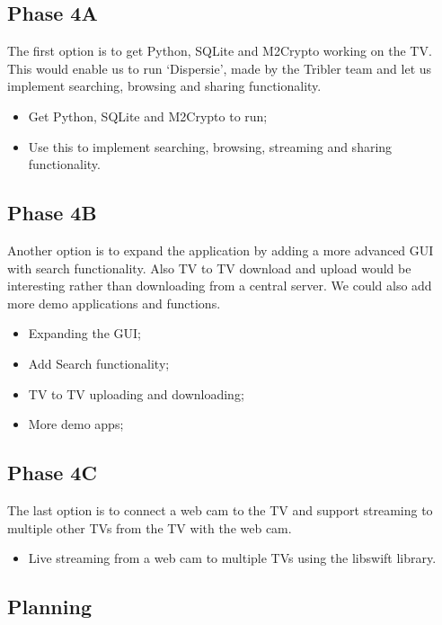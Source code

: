 \subsection{Phase 4A}
The first option is to get Python, SQLite and M2Crypto working on the TV. 
This would enable us to run `Dispersie', made by the Tribler team and let us implement searching, 
browsing and sharing functionality.

\begin{itemize}
\item Get Python, SQLite and M2Crypto to run;
\item Use this to implement searching, browsing, streaming and sharing functionality.
\end{itemize}

\subsection{Phase 4B}
Another option is to expand the application by adding a more advanced GUI with search functionality. 
Also TV to TV download and upload would be interesting rather than downloading from a central server. 
We could also add more demo applications and functions.

\begin{itemize}
\item Expanding the GUI;
\item Add Search functionality;
\item TV to TV uploading and downloading;
\item More demo apps;
\end{itemize}

\subsection{Phase 4C}
The last option is to connect a web cam to the TV and support streaming to multiple other 
TV\textquotesingle s from the TV with the web cam.

\begin{itemize}
\item Live streaming from a web cam to multiple TV\textquotesingle s using the libswift library.
\end{itemize}

\newpage
\subsection{Planning}

